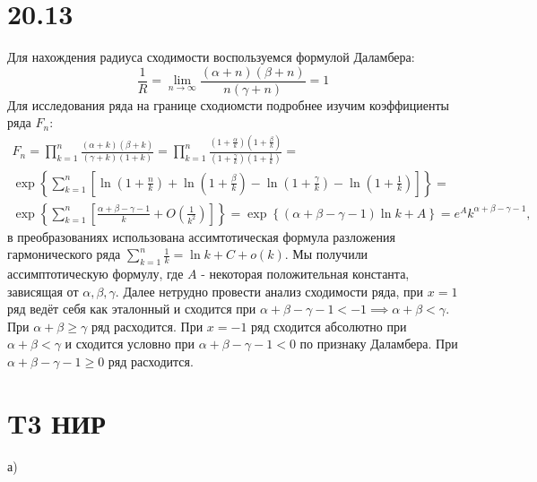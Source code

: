 \documentclass[12pt]{article}
\begin{document}
\section{20.13}
Для нахождения радиуса сходимости воспользуемся формулой Даламбера: 
\[
    \frac{1}{R} = \lim_{n \to \infty} \frac{(\alpha + n)(\beta + n)}{n (\gamma + n)} = 1
\]
Для исследования ряда на границе сходиомсти подробнее изучим коэффициенты ряда $F_n$:
\[
    \begin{split}
        F_n = \prod_{k = 1}^{n} \frac{(\alpha + k)(\beta + k)}{(\gamma + k)(1 + k)} = 
    \prod_{k = 1}^{n} \frac{(1 + \frac{\alpha}{k})(1 + \frac{\beta}{k})}{(1 + \frac{\gamma}{k})(1 + \frac{1}{k})} = \\
    \exp \left\{ \sum_{k=1}^{n} \left[ \ln \left( 1 + \frac{n}{k} \right) + \ln \left( 1 + \frac{\beta }{k} \right) - \ln \left( 1 + \frac{\gamma}{k} \right) - \ln \left( 1 + \frac{1}{k} \right) \right]  \right\}  = \\
    \exp \left\{ \sum_{k=1}^{n} \left[ \frac{\alpha + \beta - \gamma - 1}{k} + O\left( \frac{1}{k^2} \right) \right]  \right\} = 
    \exp \left\{ (\alpha + \beta - \gamma - 1)\ln k + A \right\} = e^A k^{\alpha + \beta - \gamma - 1},
    \end{split}
\]
в преобразованиях использована ассимтотическая формула разложения гармонического ряда $\sum_{k=1}^{n} \frac{1}{k} = \ln k + C + o(k)$.
Мы получили ассимптотическую формулу, где $A$ - некоторая положительная константа, зависящая от $\alpha, \beta, \gamma$. 
Далее нетрудно провести анализ сходимости ряда, при $x = 1$ ряд ведёт себя как эталонный и сходится при $\alpha + \beta - \gamma - 1 < -1 \implies \alpha + \beta < \gamma$. 
При $\alpha + \beta \geq \gamma$ ряд расходится. При $x = -1$ ряд сходится абсолютно при $\alpha + \beta < \gamma$ и сходится условно при $\alpha + \beta - \gamma - 1 < 0$ по признаку Даламбера. 
При $\alpha + \beta - \gamma - 1 \geq 0$ ряд расходится.  
\section{T3 НИР}
а) 
\end{document}
